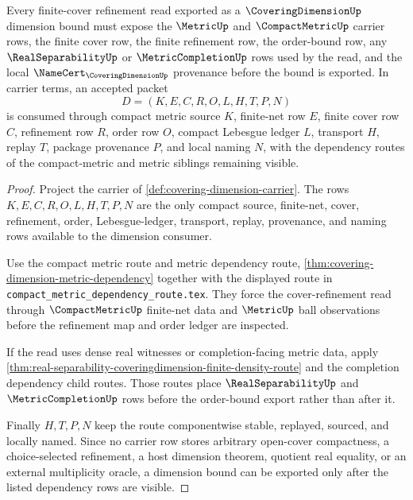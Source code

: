 \begin{theorem}
\label{thm:coveringdimension-compactmetric-dependency}
Every finite-cover refinement read exported as a $\CoveringDimensionUp$ dimension bound must expose the $\MetricUp$ and $\CompactMetricUp$ carrier rows, the finite cover row, the finite refinement row, the order-bound row, any $\RealSeparabilityUp$ or $\MetricCompletionUp$ rows used by the read, and the local $\NameCert_{\CoveringDimensionUp}$ provenance before the bound is exported. In carrier terms, an accepted packet
$$
D=(K,E,C,R,O,L,H,T,P,N)
$$
is consumed through compact metric source $K$, finite-net row $E$, finite cover row $C$, refinement row $R$, order row $O$, compact Lebesgue ledger $L$, transport $H$, replay $T$, package provenance $P$, and local naming $N$, with the dependency routes of the compact-metric and metric siblings remaining visible.
\end{theorem}
\begin{proof}
Project the carrier of \autoref{def:covering-dimension-carrier}. The rows $K,E,C,R,O,L,H,T,P,N$ are the only compact source, finite-net, cover, refinement, order, Lebesgue-ledger, transport, replay, provenance, and naming rows available to the dimension consumer.

Use the compact metric route and metric dependency route, \autoref{thm:covering-dimension-metric-dependency} together with the displayed route in \texttt{compact\_metric\_dependency\_route.tex}. They force the cover-refinement read through $\CompactMetricUp$ finite-net data and $\MetricUp$ ball observations before the refinement map and order ledger are inspected.

If the read uses dense real witnesses or completion-facing metric data, apply \autoref{thm:real-separability-coveringdimension-finite-density-route} and the completion dependency child routes. Those routes place $\RealSeparabilityUp$ and $\MetricCompletionUp$ rows before the order-bound export rather than after it.

Finally $H,T,P,N$ keep the route componentwise stable, replayed, sourced, and locally named. Since no carrier row stores arbitrary open-cover compactness, a choice-selected refinement, a host dimension theorem, quotient real equality, or an external multiplicity oracle, a dimension bound can be exported only after the listed dependency rows are visible.
\end{proof}

